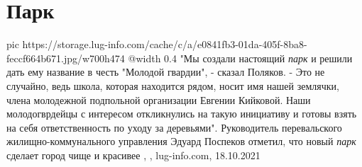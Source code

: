  
 
 
 
 
\chapter{Парк}
\label{sec:slova.park}

\ifcmt
  pic https://storage.lug-info.com/cache/c/a/e0841fb3-01da-405f-8ba8-feccf664b671.jpg/w700h474
  @width 0.4
\fi
"Мы создали настоящий \emph{парк} и решили дать ему название в честь "Молодой
гвардии", - сказал Поляков. - Это не случайно, ведь школа, которая находится
рядом, носит имя нашей землячки, члена молодежной подпольной организации
Евгении Кийковой. Наши молодогврдейцы с интересом откликнулись на такую
инициативу и готовы взять на себя ответственность по уходу за деревьями".
Руководитель перевальского жилищно-коммунального управления Эдуард Поспеков
отметил, что новый \emph{парк} сделает город чище и красивее
, , lug-info.com, 18.10.2021
